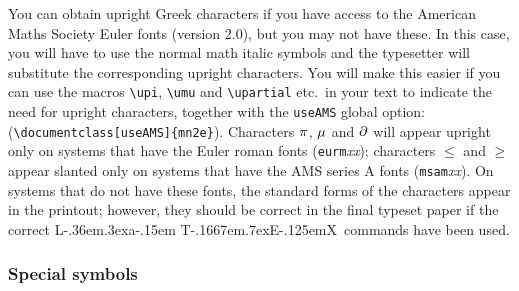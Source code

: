\documentclass[useAMS,usenatbib]{mn2e}
\def\LaTeX{L\kern-.36em\raise.3ex\hbox{a}\kern-.15em
    T\kern-.1667em\lower.7ex\hbox{E}\kern-.125emX}
\begin{document}
You can obtain upright Greek characters if you have access to the American
Maths Society Euler fonts (version 2.0), but you may not have these. In
this case, you will have to use the normal math italic symbols and the
typesetter will substitute the corresponding upright characters. You will
make this easier if you can use the macros \verb|\upi|, \verb|\umu| and
\verb|\upartial| etc.\ in your text to indicate the need for upright
characters, together with the {\tt useAMS} global option:
(\verb|\documentclass[useAMS]{mn2e}|). Characters $\pi$, $\mu$ and
$\partial$ will appear upright only on systems that have the Euler roman
fonts (\verb"eurm"\textit{xx}); characters $\leq$ and $\geq$ appear slanted
only on systems that have the AMS series A fonts (\verb"msam"\textit{xx}).
On systems that do not have these fonts, the standard forms of the
characters appear in the printout; however, they should be correct in the
final typeset paper if the correct \LaTeX\ commands have been used.



\subsubsection{Special symbols}\label{SVsymbols}
\end{document}
